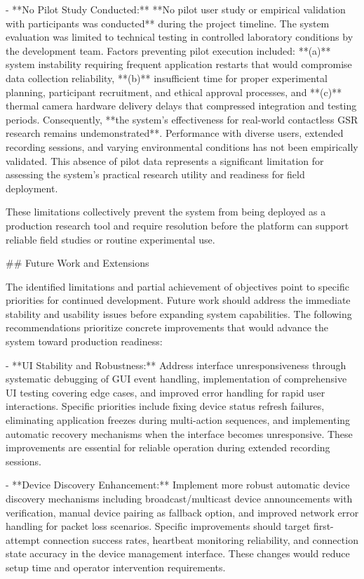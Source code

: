 \documentclass[12pt,a4paper]{article}
\begin{document}
{- **No Pilot Study Conducted:** **No pilot user study or empirical
  validation with participants was conducted** during the project timeline.
  The system evaluation was limited to technical testing in controlled
  laboratory conditions by the development team. Factors preventing pilot
  execution included: **(a)** system instability requiring frequent
  application restarts that would compromise data collection reliability,
  **(b)** insufficient time for proper experimental planning, participant
  recruitment, and ethical approval processes, and **(c)** thermal camera
  hardware delivery delays that compressed integration and testing periods.
  Consequently, **the system's effectiveness for real-world contactless
  GSR research remains undemonstrated**. Performance with diverse users,
  extended recording sessions, and varying environmental conditions has
  not been empirically validated. This absence of pilot data represents
  a significant limitation for assessing the system's practical research
  utility and readiness for field deployment.

These limitations collectively prevent the system from being deployed as a production research tool and require resolution before the platform can support reliable field studies or routine experimental use.

## Future Work and Extensions

The identified limitations and partial achievement of objectives point to specific priorities for continued development. Future work should address the immediate stability and usability issues before expanding system capabilities. The following recommendations prioritize concrete improvements that would advance the system toward production readiness:

- **UI Stability and Robustness:** Address interface unresponsiveness
  through systematic debugging of GUI event handling, implementation of
  comprehensive UI testing covering edge cases, and improved error
  handling for rapid user interactions. Specific priorities include
  fixing device status refresh failures, eliminating application freezes
  during multi-action sequences, and implementing automatic recovery
  mechanisms when the interface becomes unresponsive. These improvements
  are essential for reliable operation during extended recording sessions.

- **Device Discovery Enhancement:** Implement more robust automatic
  device discovery mechanisms including broadcast/multicast device
  announcements with verification, manual device pairing as fallback
  option, and improved network error handling for packet loss scenarios.
  Specific improvements should target first-attempt connection success
  rates, heartbeat monitoring reliability, and connection state accuracy
  in the device management interface. These changes would reduce setup
  time and operator intervention requirements.

}
\end{document}
